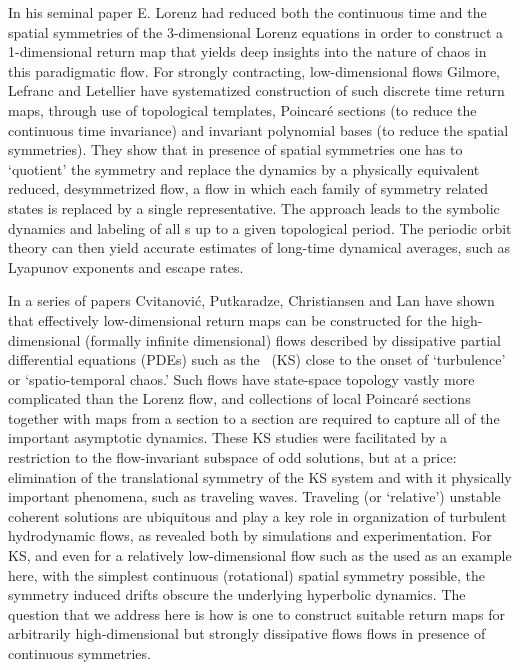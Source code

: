 %
In his seminal paper E. Lorenz had reduced both
the continuous time and the spatial symmetries of the
3-dimensional Lorenz equations in order to construct a
1-dimensional return map that yields deep
insights into the nature of chaos in this
paradigmatic flow. For strongly contracting, low-dimensional
flows Gilmore, Lefranc and
Letellier have systematized
construction of such discrete time return maps, through use
of topological templates, Poincar\'e sections (to reduce the
continuous time invariance) and invariant polynomial bases
(to reduce the spatial symmetries). They show that in
presence of spatial symmetries one has to  `quotient' the
symmetry and replace the dynamics by a physically equivalent
reduced, desymmetrized flow, a flow in which each family of
symmetry related states is replaced by a single
representative. The approach leads to the symbolic dynamics
and labeling of all \po s up to a given topological period.
The periodic orbit theory can then yield accurate estimates
of long-time dynamical averages, such as Lyapunov exponents
and escape rates.

In a series of papers Cvitanovi\'{c}, Putkaradze,
Christiansen and Lan%
have shown that effectively low-dimensional return maps can
be constructed for the high-dimensional (formally infinite
dimensional)  flows described by dissipative partial differential
equations (PDEs) such as the \KSe\ (KS) close to the onset of
`turbulence' or `spatio-temporal chaos.' Such flows have
state-space topology vastly more complicated than the Lorenz
flow, and collections of local Poincar\'e sections together
with maps from a section to a section are required to capture all
of the important asymptotic dynamics.
These KS studies were facilitated by a restriction to the
flow-invariant subspace of odd solutions, but at a price:
elimination of the translational symmetry of the KS system
and with it physically important phenomena, such as traveling
waves. Traveling (or `relative') unstable coherent solutions
are ubiquitous and play a key role in organization of
turbulent hydrodynamic flows, as revealed both by
simulations and
experimentation.
For KS, and even for a relatively
low-dimensional flow such as the
\cLe{} used as an example here, with
the simplest continuous (rotational) spatial symmetry
possible, the symmetry induced drifts obscure the underlying
hyperbolic dynamics. The question that we address here is how
is one to construct suitable return maps for arbitrarily
high-dimensional but strongly dissipative flows flows in
presence of continuous symmetries.

